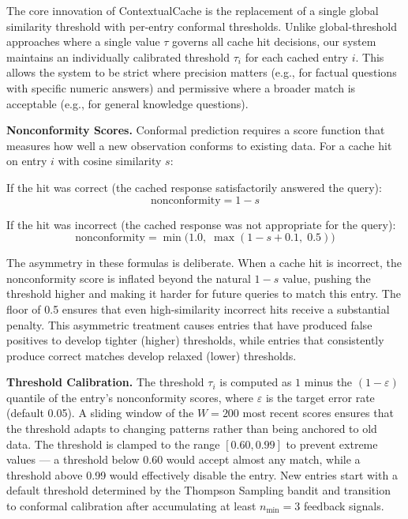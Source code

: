 \documentclass[conference]{IEEEtran}
\begin{document}
The core innovation of ContextualCache is the replacement of a single global similarity threshold with per-entry conformal thresholds. Unlike global-threshold approaches where a single value $\tau$ governs all cache hit decisions, our system maintains an individually calibrated threshold $\tau_i$ for each cached entry $i$. This allows the system to be strict where precision matters (e.g., for factual questions with specific numeric answers) and permissive where a broader match is acceptable (e.g., for general knowledge questions).

\textbf{Nonconformity Scores.} Conformal prediction requires a score function that measures how well a new observation conforms to existing data. For a cache hit on entry $i$ with cosine similarity $s$:

If the hit was correct (the cached response satisfactorily answered the query):
\begin{equation}
\text{nonconformity} = 1 - s
\label{eq:nc_correct}
\end{equation}

If the hit was incorrect (the cached response was not appropriate for the query):
\begin{equation}
\text{nonconformity} = \min\!\big(1.0,\; \max(1 - s + 0.1,\; 0.5)\big)
\label{eq:nc_incorrect}
\end{equation}

The asymmetry in these formulas is deliberate. When a cache hit is incorrect, the nonconformity score is inflated beyond the natural $1 - s$ value, pushing the threshold higher and making it harder for future queries to match this entry. The floor of 0.5 ensures that even high-similarity incorrect hits receive a substantial penalty. This asymmetric treatment causes entries that have produced false positives to develop tighter (higher) thresholds, while entries that consistently produce correct matches develop relaxed (lower) thresholds.

\textbf{Threshold Calibration.} The threshold $\tau_i$ is computed as $1$ minus the $(1 - \varepsilon)$ quantile of the entry's nonconformity scores, where $\varepsilon$ is the target error rate (default 0.05). A sliding window of the $W = 200$ most recent scores ensures that the threshold adapts to changing patterns rather than being anchored to old data. The threshold is clamped to the range $[0.60, 0.99]$ to prevent extreme values --- a threshold below 0.60 would accept almost any match, while a threshold above 0.99 would effectively disable the entry. New entries start with a default threshold determined by the Thompson Sampling bandit and transition to conformal calibration after accumulating at least $n_{\min} = 3$ feedback signals.
\end{document}
